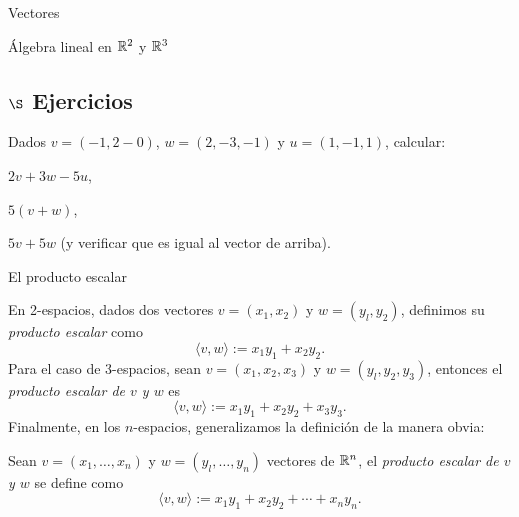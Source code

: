 \begin{chapter}{Vectores}
\begin{section}{\'Algebra lineal en $\mathbb R^2$ y $\mathbb R^3$}
\subsection*{$\S$ Ejercicios}   
\begin{enumex}
    \item Dados $v = (-1, 2-0)$, $w = (2,-3,-1)$ y $u = (1,-1,1)$, calcular:
    \begin{enumex}
        \item $2v + 3w -5u$,
        \item $5(v+w)$, 
        \item $5v + 5w$ (y verificar que es igual al vector de arriba).
    \end{enumex}
\end{enumex}




\end{section}
    
    
    
    \begin{section}{El producto escalar}\label{seccion-el-producto-escalar}
        
        En 2-espacios, dados dos vectores $v = (x_1, x_2)$ y $w= (y_l, y_2)$, definimos su \textit{producto escalar} como
        \begin{equation*}
            \langle v , w  \rangle :=x_1y_1 + x_2y_2.
        \end{equation*}
        Para el caso de 3-espacios, sean   $v = (x_1, x_2,x_3)$ y $w= (y_l, y_2,y_3)$,  entonces el \textit{producto escalar de $v$ y $w$} es
        \begin{equation*}
            \langle v , w  \rangle :=x_1y_1 + x_2y_2+x_3y_3.
        \end{equation*}
        Finalmente, en los $n$-espacios,  generalizamos la definición de la manera obvia: 
        
        \begin{definicion}
            Sean  $v = (x_1, \ldots,x_n)$ y $w= (y_l, \ldots,y_n)$ vectores de $\mathbb R^n$,  el \textit{producto escalar de $v$ y $w$} se define como		
            \begin{equation*}
            \langle v , w \rangle :=x_1y_1 + x_2y_2+\cdots+x_ny_n.
            \end{equation*}
        \end{definicion}
        

\end{section}
\end{chapter}
